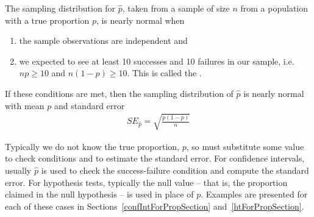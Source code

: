 \begin{termBox}{
The sampling distribution for $\hat{p}$, taken from a sample of size $n$ from a population with a true proportion $p$, is nearly normal when
\begin{enumerate}
\item the sample observations are independent and
\item we expected to see at least 10 successes and 10 failures in our sample, i.e. $np\geq10$ and $n(1-p)\geq10$. This is called the .
\end{enumerate}
If these conditions are met, then the sampling distribution of $\hat{p}$ is nearly normal with mean $p$ and standard error
\begin{eqnarray}
SE_{\hat{p}} = \sqrt{\frac{p(1-p)}{n}}
\label{seOfPHat}
\end{eqnarray}}
\end{termBox}

Typically we do not know the true proportion, $p$, so must substitute some value to check conditions and to estimate the standard error. For confidence intervals, usually $\hat{p}$ is used to check the success-failure condition and compute the standard error. For hypothesis tests, typically the null value -- that is, the proportion claimed in the null hypothesis -- is used in place of $p$. Examples are presented for each of these cases in Sections~\ref{confIntForPropSection} and~\ref{htForPropSection}.

